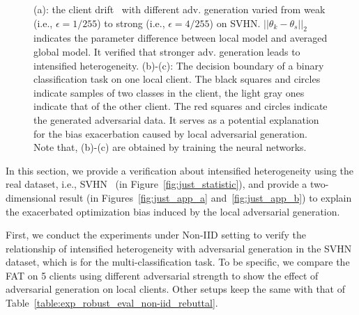 \documentclass{article} %
\theoremstyle{plain}
\theoremstyle{definition}
\theoremstyle{remark}
\begin{document}
\begin{figure}[htp]
\centering
\vspace{2mm}
    \hspace{0.1in}
    \caption{ (a): the client drift~\citep{li2018federated} with different adv. generation varied from weak (i.e., $\epsilon=1/255$) to strong (i.e., $\epsilon=4/255$) on SVHN. $||\theta_{k}-\theta_{s}||_2$ indicates the parameter difference between local model and averaged global model. It verified that stronger adv. generation leads to intensified heterogeneity. (b)-(c): The decision boundary of a binary classification task on one local client. The black squares and circles indicate samples of two classes in the client, the light gray ones indicate that of the other client. The red squares and circles indicate the generated adversarial data. It serves as a potential explanation for the bias exacerbation caused by local adversarial generation. Note that, (b)-(c) are obtained by training the neural networks.}
    \label{fig:just_reason_app}
    \vspace{2mm}
\end{figure}



In this section, we provide a verification about intensified heterogeneity using the real dataset, i.e., SVHN~\citep{netzer2011reading_SVHN} (in Figure~\ref{fig:just_statistic}), and provide a two-dimensional result (in Figures~\ref{fig:just_app_a} and~\ref{fig:just_app_b}) to explain the exacerbated optimization bias induced by the local adversarial generation.

First, we conduct the experiments under Non-IID setting to verify the relationship of intensified heterogeneity with adversarial generation in the SVHN dataset, which is for the multi-classification task. To be specific, we compare the FAT on 5 clients using different adversarial strength to show the effect of adversarial generation on local clients. Other setups keep the same with that of Table~\ref{table:exp_robust_eval_non-iid_rebuttal}.
\end{document}
